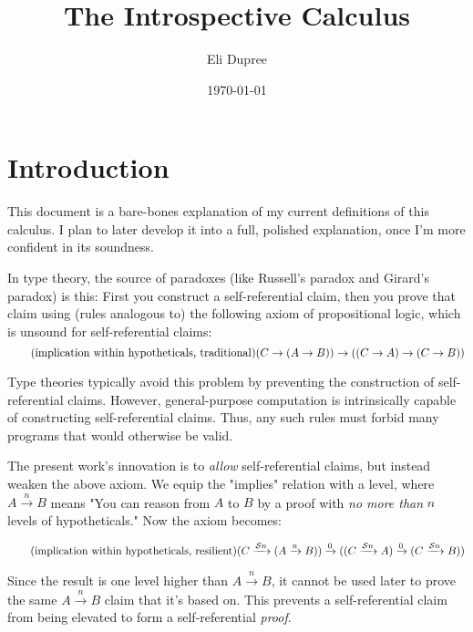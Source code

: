\documentclass{article}
\title{The Introspective Calculus}
\author{Eli Dupree}
\date{\today}
\begin{document}
  \maketitle
  
  \section{Introduction}
  
  This document is a bare-bones explanation of my current definitions of this calculus.
  I plan to later develop it into a full, polished explanation, once I'm more confident in its soundness.
  
  In type theory, the source of paradoxes (like Russell's paradox and Girard's paradox) is this: First you construct a self-referential claim, then you prove that claim using (rules analogous to) the following axiom of propositional logic, which is unsound for self-referential claims:
  \begin{equation*}
    \tag{implication within hypotheticals, traditional}
    (C \rightarrow (A \rightarrow B)) \rightarrow ((C \rightarrow A) \rightarrow (C \rightarrow B))
    \vspace{0.8em}
  \end{equation*}
  
  Type theories typically avoid this problem by preventing the construction of self-referential claims. However, general-purpose computation is intrinsically capable of constructing self-referential claims. Thus, any such rules must forbid many programs that would otherwise be valid.
  
  \renewcommand{\implies}[1]{\xrightarrow{#1}}
  The present work's innovation is to \emph{allow} self-referential claims, but instead weaken the above axiom. We equip the "implies" relation with a level, where $A \implies{n} B$ means "You can reason from $A$ to $B$ by a proof with \emph{no more than} $n$ levels of hypotheticals." Now the axiom becomes:
  
  \newcommand{\lzero}{0}
  \newcommand{\lsucc}[1]{\mathcal{S} #1}
  \begin{equation*}
    \tag{implication within hypotheticals, resilient}
    (C \implies{\lsucc n} (A \implies{n} B)) \implies{\lzero} ((C \implies{\lsucc n} A) \implies{\lzero} (C \implies{\lsucc n} B))
    \vspace{0.8em}
  \end{equation*}
  
  Since the result is one level higher than $A \implies{n} B$, it cannot be used later to prove the same $A \implies{n} B$ claim that it's based on. This prevents a self-referential claim from being elevated to form a self-referential \emph{proof}.
  
\end{document}
